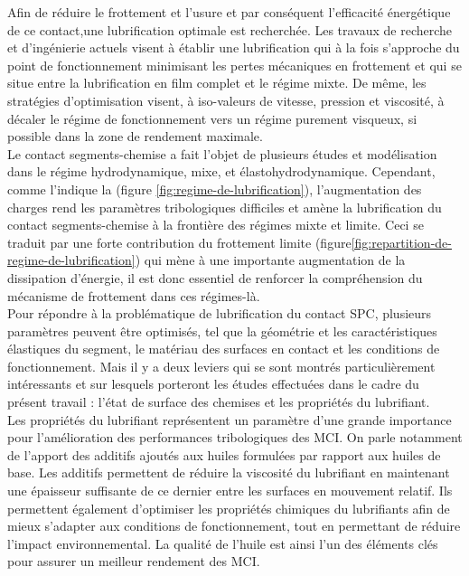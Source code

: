 Afin de réduire le frottement et l'usure et par conséquent l'efficacité énergétique de ce contact,une lubrification optimale est recherchée. Les travaux de recherche et d'ingénierie actuels visent à établir une lubrification qui à la fois s'approche du point de fonctionnement minimisant les pertes mécaniques en frottement et qui se situe entre la lubrification en film complet et le régime mixte. De même, les stratégies d’optimisation visent, à iso-valeurs de vitesse, pression et viscosité, à décaler le régime de fonctionnement vers un régime purement visqueux, si possible dans la zone de rendement maximale.\\

Le contact segments-chemise a fait l’objet de plusieurs études et modélisation dans le régime hydrodynamique, mixe, et élastohydrodynamique. Cependant, comme l’indique la (figure \ref{fig:regime-de-lubrification}), l'augmentation des charges rend les paramètres tribologiques difficiles et amène la lubrification du contact segments-chemise à la frontière des régimes mixte et limite. Ceci se traduit par une forte contribution du frottement limite (figure\ref{fig:repartition-de-regime-de-lubrification}) qui mène à une importante augmentation de la dissipation d'énergie, il est donc essentiel de renforcer la compréhension du mécanisme de frottement dans ces régimes-là.\\

Pour répondre à la problématique de lubrification du contact SPC, plusieurs paramètres peuvent être optimisés, tel que la géométrie et les caractéristiques élastiques du segment, le matériau des surfaces en contact et les conditions de fonctionnement. Mais il y a deux leviers qui se sont montrés particulièrement intéressants et sur lesquels porteront les études effectuées dans le cadre du présent travail : l'état de surface des chemises et les propriétés du lubrifiant.\\

Les propriétés du lubrifiant représentent un paramètre d'une grande importance pour
l'amélioration des performances tribologiques des MCI. On parle notamment de l'apport des additifs ajoutés aux huiles formulées par rapport aux huiles de base. Les additifs permettent de réduire la viscosité du lubrifiant en maintenant une épaisseur suffisante de ce dernier entre les surfaces en mouvement relatif. Ils permettent également d'optimiser les propriétés chimiques du lubrifiants afin de mieux s'adapter aux conditions de fonctionnement, tout en permettant de réduire l'impact environnemental. La qualité de l'huile est ainsi l'un des éléments clés pour assurer un meilleur rendement des MCI.\\

